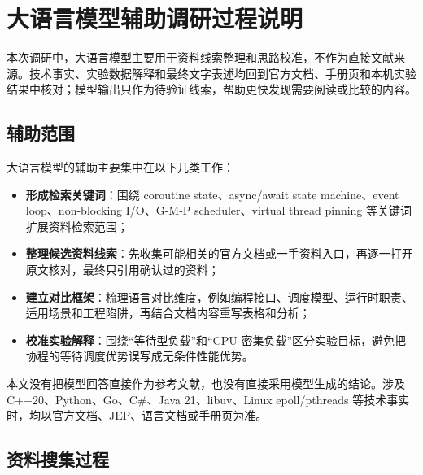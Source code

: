 \documentclass[UTF8,zihao=-4]{ctexart}
\begin{document}
\section{大语言模型辅助调研过程说明}

本次调研中，大语言模型主要用于资料线索整理和思路校准，不作为直接文献来源。技术事实、实验数据解释和最终文字表述均回到官方文档、手册页和本机实验结果中核对；模型输出只作为待验证线索，帮助更快发现需要阅读或比较的内容。

\subsection{辅助范围}

大语言模型的辅助主要集中在以下几类工作：

\begin{itemize}
  \item \textbf{形成检索关键词}：围绕 coroutine state、async/await state machine、event loop、non-blocking I/O、G-M-P scheduler、virtual thread pinning 等关键词扩展资料检索范围；
  \item \textbf{整理候选资料线索}：先收集可能相关的官方文档或一手资料入口，再逐一打开原文核对，最终只引用确认过的资料；
  \item \textbf{建立对比框架}：梳理语言对比维度，例如编程接口、调度模型、运行时职责、适用场景和工程陷阱，再结合文档内容重写表格和分析；
  \item \textbf{校准实验解释}：围绕“等待型负载”和“CPU 密集负载”区分实验目标，避免把协程的等待调度优势误写成无条件性能优势。
\end{itemize}

本文没有把模型回答直接作为参考文献，也没有直接采用模型生成的结论。涉及 C++20、Python、Go、C\#、Java 21、libuv、Linux epoll/pthreads 等技术事实时，均以官方文档、JEP、语言文档或手册页为准。

\subsection{资料搜集过程}
\end{document}
